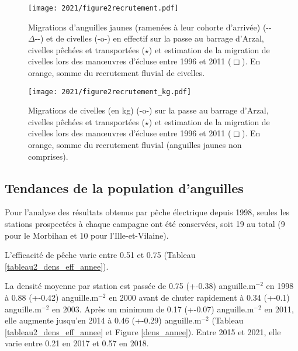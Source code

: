 \documentclass[10pt,twocolumn,titlepage,twoside]{article}\usepackage[]{graphicx}\usepackage[]{color}
\begin{document}
\begin{figure}[htbp]
\centering
\texttt{[image: 2021/figure2recrutement.pdf]}
\caption[Tendance des densités modèle]{Migrations d'anguilles
jaunes (ramenées à leur cohorte d'arrivée) (\textmd{{}-{}-${\Delta}$-{}-}) et de civelles
(\textmd{{}-}o\textmd{{}-}) en effectif sur la passe au barrage d'Arzal,
civelles pêchées et transportées ($\star$) et estimation de la migration de civelles
lors des man{\oe}uvres d'écluse entre 1996 et 2011 ($\Box$). En orange, somme du
recrutement fluvial de civelles.}
\label{figure2recrutement}
\end{figure}

\begin{figure}[htbp]
\centering
\texttt{[image: 2021/figure2recrutement\_kg.pdf]}
\caption[Tendance des densités modèle]{Migrations de civelles (en kg)
(\textmd{{}-}o\textmd{{}-}) sur la passe au barrage d'Arzal, civelles pêchées
et transportées ($\star$) et estimation de la migration de civelles
lors des man{\oe}uvres d'écluse entre 1996 et 2011 ($\Box$). En orange, somme du
recrutement fluvial (anguilles jaunes non comprises).}
\label{figure2recrutement_kg}
\end{figure}

\subsection{Tendances de la population d'anguilles}















Pour l'analyse des résultats obtenus par pêche
électrique depuis 1998, seules les stations prospectées à chaque
campagne ont été conservées, soit 19 au total (9 pour le Morbihan
et 10 pour l'Ille-et-Vilaine).
\small

\normalsize
L'efficacité de pêche varie entre 0.51 et
0.75 (Tableau \ref{tableau2_dens_eff_annee}). 

La densité moyenne par station est
passée de 0.75 (+-0.38) anguille.m$^{-2}$ en 1998 
à 0.88 (+-0.42) anguille.m$^{-2}$ en 2000 
avant de chuter rapidement à 0.34 (+-0.1) anguille.m$^{-2}$ en 2003. 
Après un minimum de 0.17
(+-0.07) anguille.m$^{-2}$ en 2011, elle augmente
jusqu'en 2014 à 0.46
(+-0.29) anguille.m$^{-2}$
(Tableau \ref{tableau2_dens_eff_annee} et Figure \ref{dens_annee}).
Entre 2015 et 2021, elle varie entre 0.21 en
2017 et 0.57 en 2018.
\end{document}

